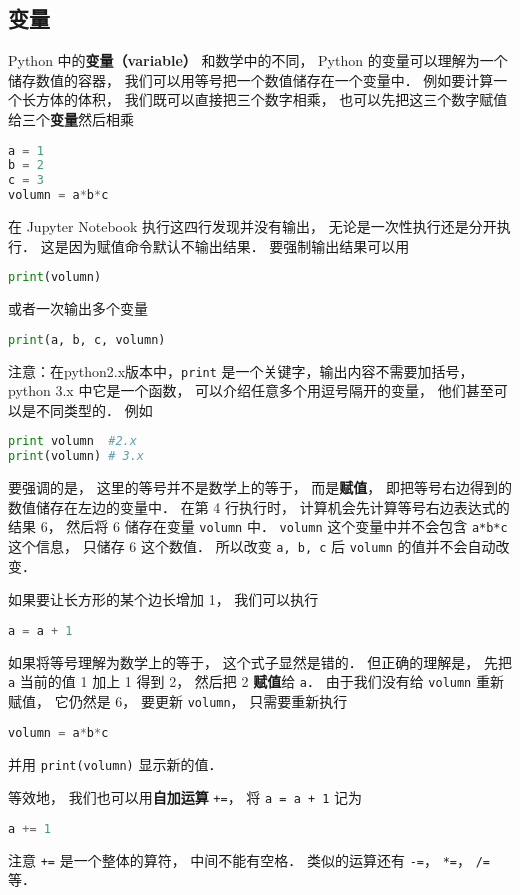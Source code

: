 \subsection{变量}
Python 中的\textbf{变量（variable）} 和数学中的不同， Python 的变量可以理解为一个储存数值的容器， 我们可以用等号把一个数值储存在一个变量中． 例如要计算一个长方体的体积， 我们既可以直接把三个数字相乘， 也可以先把这三个数字赋值给三个\textbf{变量}然后相乘
\begin{lstlisting}[language=python]
a = 1
b = 2
c = 3
volumn = a*b*c
\end{lstlisting}
在 Jupyter Notebook 执行这四行发现并没有输出， 无论是一次性执行还是分开执行． 这是因为赋值命令默认不输出结果． 要强制输出结果可以用
\begin{lstlisting}[language=python]
print(volumn)
\end{lstlisting}
或者一次输出多个变量
\begin{lstlisting}[language=python]
print(a, b, c, volumn)
\end{lstlisting}
注意：在python2.x版本中，\verb|print| 是一个关键字，输出内容不需要加括号， python 3.x 中它是一个函数， 可以介绍任意多个用逗号隔开的变量， 他们甚至可以是不同类型的． 例如
\begin{lstlisting}[language=python]
print volumn  #2.x
print(volumn) # 3.x
\end{lstlisting}
要强调的是， 这里的等号并不是数学上的等于， 而是\textbf{赋值}， 即把等号右边得到的数值储存在左边的变量中． 在第 4 行执行时， 计算机会先计算等号右边表达式的结果 6， 然后将 6 储存在变量 \verb|volumn| 中． \verb|volumn| 这个变量中并不会包含 \verb|a*b*c| 这个信息， 只储存 6 这个数值． 所以改变 \verb|a, b, c| 后 \verb|volumn| 的值并不会自动改变．

如果要让长方形的某个边长增加 1， 我们可以执行
\begin{lstlisting}[language=python]
a = a + 1
\end{lstlisting}
如果将等号理解为数学上的等于， 这个式子显然是错的． 但正确的理解是， 先把 \verb|a| 当前的值 1 加上 1 得到 2， 然后把 2 \textbf{赋值}给 \verb|a|． 由于我们没有给 \verb|volumn| 重新赋值， 它仍然是 6， 要更新 \verb|volumn|， 只需要重新执行
\begin{lstlisting}[language=python]
volumn = a*b*c
\end{lstlisting}
并用 \verb|print(volumn)| 显示新的值．

等效地， 我们也可以用\textbf{自加运算} \verb|+=|， 将 \verb|a = a + 1| 记为
\begin{lstlisting}[language=python]
a += 1
\end{lstlisting}
注意 \verb|+=| 是一个整体的算符， 中间不能有空格． 类似的运算还有 \verb|-=|， \verb|*=|， \verb|/=| 等．

